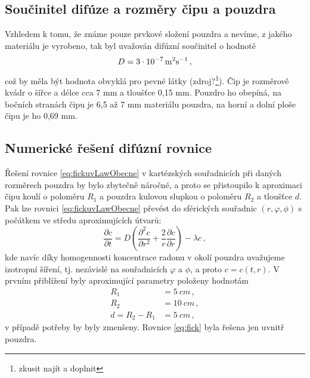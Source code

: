 \documentclass[11pt,a4paper]{article}
\begin{document}
\subsection{Součinitel difúze a rozměry čipu a pouzdra}\label{rozmery}
Vzhledem k tomu, že známe pouze prvkové složení pouzdra a nevíme, z jakého materiálu je vyrobeno, tak byl uvažován difúzní součinitel o hodnotě
\begin{equation}
D=\SI[parse-numbers = false]{3\cdot 10^{-7}}{m^2s^{-1}}\,,
\end{equation}
což by měla být hodnota obvyklá pro pevné látky (zdroj?\footnote{zkusit najít a doplnit}). Čip je rozměrově kvádr o šířce a délce cca 7 mm a tloušťce 0,15 mm. Pouzdro ho obepíná, na bočních stranách čipu je 6,5 až 7 mm materiálu pouzdra, na horní a dolní ploše čipu je ho 0,69 mm. 

\subsection{Numerické řešení difúzní rovnice}\label{pol:aproximace}
Řešení rovnice \eqref{eq:fickuvLawObecne} v kartézských souřadnicích při daných rozměrech pouzdra by bylo zbytečně náročné, a proto se přistoupilo k aproximaci čipu koulí o poloměru $R_1$ a pouzdra kulovou slupkou o poloměru $R_2$ a tloušťce $d$. Pak lze rovnici \eqref{eq:fickuvLawObecne} převést do sférických souřadnic $(r, \varphi, \phi)$ s počátkem ve středu aproximujících útvarů:
\begin{equation}
\frac{\partial c}{\partial t}=D\left(\frac{\partial^2c}{\partial r^2}+\frac{2}{r}\frac{\partial c}{\partial r}\right)-\lambda c\,,\label{eq:fick}
\end{equation}
kde navíc díky homogennosti koncentrace radonu v okolí pouzdra uvažujeme izotropní šíření, tj. nezávislé na souřadnicích $\varphi$ a $\phi$, a proto $c=c(t,r)$. V prvním přiblížení byly aproximující parametry položeny hodnotám
\begin{align}
	R_1&=\SI{5}{cm}\,,\\
	R_2&=\SI{10}{cm}\,,\\
	d=R_2-R_1&=\SI{5}{cm}\,,
\end{align}
v případě potřeby by byly zmenšeny. Rovnice \eqref{eq:fick} byla řešena jen uvnitř pouzdra. 
\end{document}
